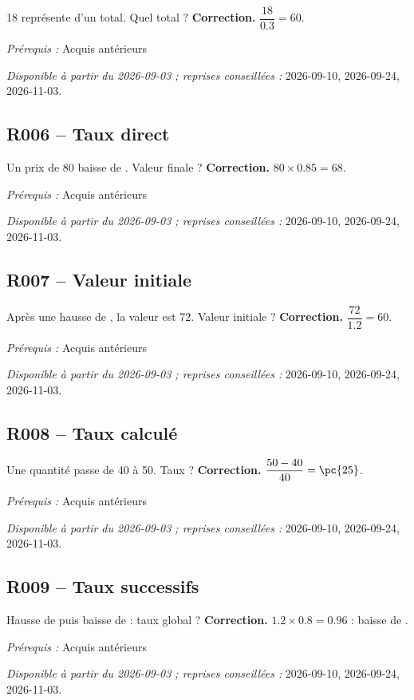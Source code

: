 18 représente  d’un total. Quel total ?
\ifmxteacher\textbf{Correction.} $\dfrac{18}{\num{0,3}}=60$.\par\textit{Prérequis :} Acquis antérieurs\par\textit{Disponible à partir du 2026-09-03 ; reprises conseillées :} 2026-09-10, 2026-09-24, 2026-11-03.\fi
{}\subsection*{R006 -- Taux direct}\label{R006}
Un prix de 80 baisse de . Valeur finale ?
\ifmxteacher\textbf{Correction.} $80\times\num{0,85}=68$.\par\textit{Prérequis :} Acquis antérieurs\par\textit{Disponible à partir du 2026-09-03 ; reprises conseillées :} 2026-09-10, 2026-09-24, 2026-11-03.\fi
{}\subsection*{R007 -- Valeur initiale}\label{R007}
Après une hausse de , la valeur est 72. Valeur initiale ?
\ifmxteacher\textbf{Correction.} $\dfrac{72}{\num{1,2}}=60$.\par\textit{Prérequis :} Acquis antérieurs\par\textit{Disponible à partir du 2026-09-03 ; reprises conseillées :} 2026-09-10, 2026-09-24, 2026-11-03.\fi
{}\subsection*{R008 -- Taux calculé}\label{R008}
Une quantité passe de 40 à 50. Taux ?
\ifmxteacher\textbf{Correction.} $\dfrac{50-40}{40}=\pc{25}$.\par\textit{Prérequis :} Acquis antérieurs\par\textit{Disponible à partir du 2026-09-03 ; reprises conseillées :} 2026-09-10, 2026-09-24, 2026-11-03.\fi
{}\subsection*{R009 -- Taux successifs}\label{R009}
Hausse de  puis baisse de  : taux global ?
\ifmxteacher\textbf{Correction.} $\num{1,2}\times\num{0,8}=\num{0,96}$ : baisse de .\par\textit{Prérequis :} Acquis antérieurs\par\textit{Disponible à partir du 2026-09-03 ; reprises conseillées :} 2026-09-10, 2026-09-24, 2026-11-03.\fi
